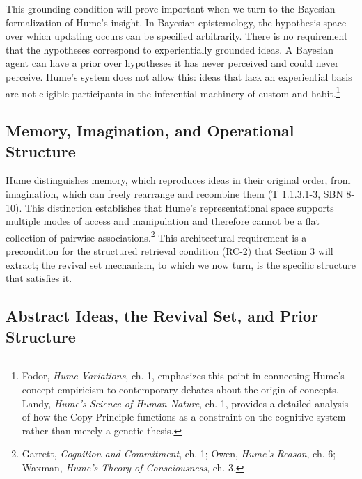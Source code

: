 \documentclass[11pt]{article}
\begin{document}
This grounding condition will prove important when we turn to the Bayesian formalization of Hume's insight. In Bayesian epistemology, the hypothesis space over which updating occurs can be specified arbitrarily. There is no requirement that the hypotheses correspond to experientially grounded ideas. A Bayesian agent can have a prior over hypotheses it has never perceived and could never perceive. Hume's system does not allow this: ideas that lack an experiential basis are not eligible participants in the inferential machinery of custom and habit.\footnote{Fodor, \emph{Hume Variations}, ch. 1, emphasizes this point in connecting Hume's concept empiricism to contemporary debates about the origin of concepts. Landy, \emph{Hume's Science of Human Nature}, ch. 1, provides a detailed analysis of how the Copy Principle functions as a constraint on the cognitive system rather than merely a genetic thesis.}

\subsection{Memory, Imagination, and Operational Structure}

Hume distinguishes memory, which reproduces ideas in their original order, from imagination, which can freely rearrange and recombine them (T 1.1.3.1-3, SBN 8-10). This distinction establishes that Hume's representational space supports multiple modes of access and manipulation and therefore cannot be a flat collection of pairwise associations.\footnote{Garrett, \emph{Cognition and Commitment}, ch. 1; Owen, \emph{Hume's Reason}, ch. 6; Waxman, \emph{Hume's Theory of Consciousness}, ch. 3.} This architectural requirement is a precondition for the structured retrieval condition (RC-2) that Section 3 will extract; the revival set mechanism, to which we now turn, is the specific structure that satisfies it.

\subsection{Abstract Ideas, the Revival Set, and Prior Structure}
\end{document}
